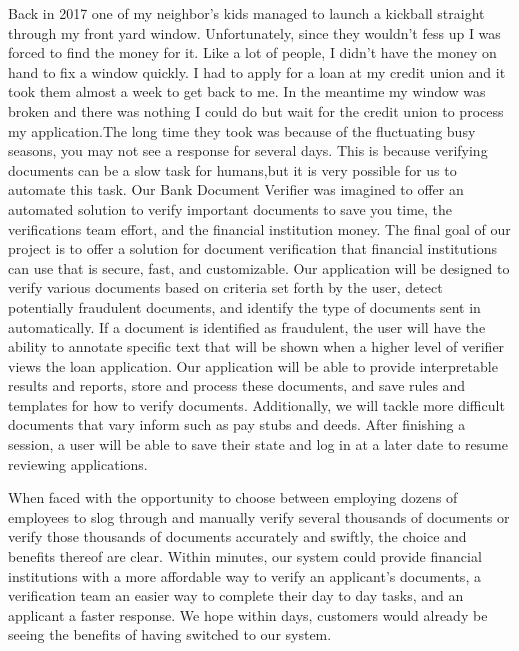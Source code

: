 \doublespacing

Back in 2017 one of my neighbor’s kids managed to launch a kickball straight through my front yard window. Unfortunately, since they wouldn’t fess up I was forced to find the money for it. Like a lot of people, I didn’t have the money on hand to fix a window quickly. I had to apply for a loan at my credit union and it took them almost a week to get back to me. In the meantime my window was broken and there was nothing I could do but wait for the credit union to process my application.The long time they took was because of the fluctuating busy seasons, you may not see a response for several days. This is because verifying documents can be a slow task for humans,but it is very possible for us to automate this task. Our Bank Document Verifier was imagined to offer an automated solution to verify important documents to save you time, the verifications team effort, and the financial institution money. The final goal of our project is to offer a solution for document verification that financial institutions can use that is secure, fast, and customizable. Our application will be designed to verify various documents based on criteria set forth by the user, detect potentially fraudulent documents, and identify the type of documents sent in automatically. If a document is identified as fraudulent, the user will have the ability to annotate specific text that will be shown when a higher level of verifier views the loan application. Our application will be able to provide interpretable results and reports, store and process these documents, and save rules and templates for how to verify documents. Additionally, we will tackle more difficult documents that vary inform such as pay stubs and deeds. After finishing a session, a user will be able to save their state and log in at a later date to resume reviewing applications.

When faced with the opportunity to choose between employing dozens of employees to slog through and manually verify several thousands of documents or verify those thousands of documents accurately and swiftly, the choice and benefits thereof are clear. Within minutes, our system could provide financial institutions with a more affordable way to verify an applicant’s documents, a verification team an easier way to complete their day to day tasks, and an applicant a faster response. We hope within days, customers would already be seeing the benefits of having switched to our system.

\singlespacing